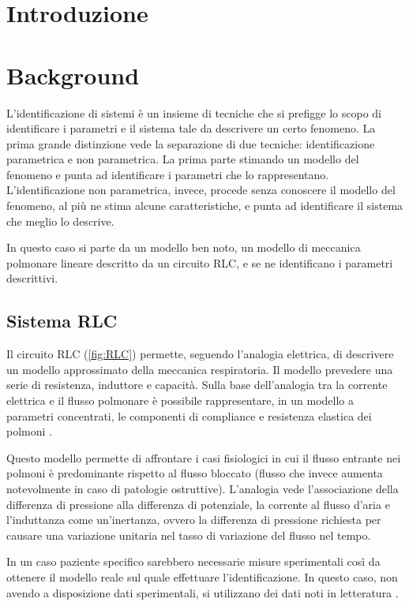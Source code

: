 \section{Introduzione}
\textcolor{blue}{\lipsum[1-2]}
\section{Background}

L'identificazione di sistemi è un insieme di tecniche che si prefigge lo scopo di identificare i parametri e il sistema tale da descrivere un certo fenomeno. La prima grande distinzione vede la separazione di due tecniche: identificazione parametrica e non parametrica. La prima parte stimando un modello del fenomeno e punta ad identificare i parametri che lo rappresentano. L'identificazione non parametrica, invece, procede senza conoscere il modello del fenomeno, al più ne stima alcune caratteristiche, e punta ad identificare il sistema che meglio lo descrive.

In questo caso si parte da un modello ben noto, un modello di meccanica polmonare lineare descritto da un circuito RLC, e se ne identificano i parametri descrittivi.

\subsection{Sistema RLC}

Il circuito RLC (\cref{fig:RLC}) permette, seguendo l'analogia elettrica, di descrivere un modello approssimato della meccanica respiratoria. Il modello prevedere una serie di resistenza, induttore e capacità. Sulla base dell'analogia tra la corrente elettrica e il flusso polmonare è possibile rappresentare, in un modello a parametri concentrati, le componenti di compliance e resistenza elastica dei polmoni \cite{ghafarian_review_nodate}. 

Questo modello permette di affrontare i casi fisiologici in cui il flusso entrante nei polmoni è predominante rispetto al flusso bloccato (flusso che invece aumenta notevolmente in caso di patologie ostruttive). L'analogia vede l'associazione della differenza di pressione alla differenza di potenziale, la corrente al flusso d'aria e l'induttanza come un'inertanza, ovvero la differenza di pressione richiesta per causare una variazione unitaria nel tasso di variazione del flusso nel tempo. 

In un caso paziente specifico sarebbero necessarie misure sperimentali così da ottenere il modello reale sul quale effettuare l'identificazione. In questo caso, non avendo a disposizione dati sperimentali, si utilizzano dei dati noti in letteratura \cite{khoo_physiological_2018}. 


